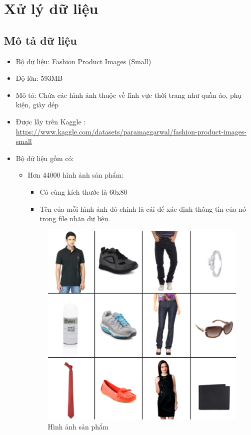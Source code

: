 \section{Xử lý dữ liệu}
\subsection{Mô tả dữ liệu}
\begin{itemize}
    \item Bộ dữ liệu: Fashion Product Images (Small)
    \item Độ lớn: 593MB
    \item Mô tả: Chứa các hình ảnh thuộc về lĩnh vực thời trang như quần áo, phụ kiện, giày dép
    \item Được lấy trên Kaggle : \href{https://www.kaggle.com/datasets/paramaggarwal/fashion-product-images-small}{https://www.kaggle.com/datasets/paramaggarwal/fashion-product-images-small}
    \item Bộ dữ liệu gồm có:
    \begin{itemize}
        \item Hơn 44000 hình ảnh sản phẩm:
        \begin{itemize}
            \item Có cùng kích thước là 60x80
            \item Tên của mỗi hình ảnh đó chính là cái để xác định thông tin của nó trong file nhãn dữ liệu.
        \end{itemize}
        \begin{center}
            \begin{figure}[!h]
                \centering
                \includegraphics[scale = 0.9]{fileanh/43.png}
                \caption{Hình ảnh sản phẩm}
            \end{figure}
        \end{center}
        \newpage


\end{itemize}
\end{itemize}
